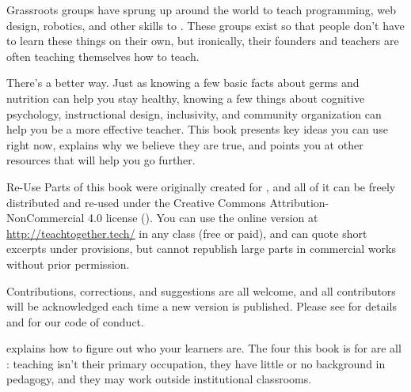 
Grassroots groups have sprung up around the world
to teach programming, web design, robotics, and other skills
to .
These groups exist so that people don't have to learn these things on their own,
but ironically,
their founders and teachers are often teaching themselves how to teach.

There's a better way.
Just as knowing a few basic facts about germs and nutrition can help you stay healthy,
knowing a few things about cognitive psychology,
instructional design,
inclusivity,
and community organization
can help you be a more effective teacher.
This book presents key ideas you can use right now,
explains why we believe they are true,
and points you at other resources that will help you go further.

\begin{aside}{Re-Use}
  Parts of this book were originally created for
  ,
  and all of it can be freely distributed and re-used
  under the Creative Commons Attribution-NonCommercial 4.0 license
  ().
  You can use the online version at \url{http://teachtogether.tech/} in any class
  (free or paid),
  and can quote short excerpts under  provisions,
  but cannot republish large parts in commercial works without prior permission.

  Contributions, corrections, and suggestions are all welcome,
  and all contributors will be acknowledged each time a new version is published.
  Please see  for details
  and  for our code of conduct.
\end{aside}


 explains how to figure out who your learners are.
The four this book is for are all :
teaching isn't their primary occupation,
they have little or no background in pedagogy,
and they may work outside institutional classrooms.


